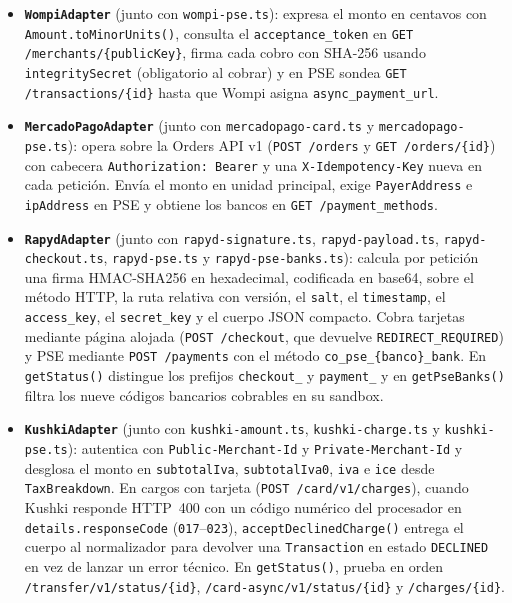 \begin{itemize}
  \item \textbf{\texttt{WompiAdapter}} (junto con \texttt{wompi-pse.ts}): expresa el monto en centavos con \texttt{Amount.toMinorUnits()}, consulta el \texttt{acceptance\_token} en \texttt{GET /merchants/\{publicKey\}}, firma cada cobro con SHA-256 usando \texttt{integritySecret} (obligatorio al cobrar) y en PSE sondea \texttt{GET /transactions/\{id\}} hasta que Wompi asigna \texttt{async\_payment\_url}.
  \item \textbf{\texttt{MercadoPagoAdapter}} (junto con \texttt{mercadopago-card.ts} y \texttt{mercadopago-pse.ts}): opera sobre la Orders API v1 (\texttt{POST /orders} y \texttt{GET /orders/\{id\}}) con cabecera \texttt{Authorization: Bearer} y una \texttt{X-Idempotency-Key} nueva en cada petición. Envía el monto en unidad principal, exige \texttt{PayerAddress} e \texttt{ipAddress} en PSE y obtiene los bancos en \texttt{GET /payment\_methods}.
  \item \textbf{\texttt{RapydAdapter}} (junto con \texttt{rapyd-\allowbreak{}signature.ts}, \texttt{rapyd-\allowbreak{}payload.ts}, \texttt{rapyd-\allowbreak{}checkout.ts}, \texttt{rapyd-\allowbreak{}pse.ts} y \texttt{rapyd-\allowbreak{}pse-\allowbreak{}banks.ts}): calcula por petición una firma HMAC-SHA256 en hexadecimal, codificada en base64, sobre el método HTTP, la ruta relativa con versión, el \texttt{salt}, el \texttt{timestamp}, el \texttt{access\_\allowbreak{}key}, el \texttt{secret\_\allowbreak{}key} y el cuerpo JSON compacto. Cobra tarjetas mediante página alojada (\texttt{POST /\allowbreak{}checkout}, que devuelve \texttt{REDIRECT\_\allowbreak{}REQUIRED}) y PSE mediante \texttt{POST /\allowbreak{}payments} con el método \texttt{co\_\allowbreak{}pse\_\{banco\}\_\allowbreak{}bank}. En \texttt{getStatus()} distingue los prefijos \texttt{checkout\_} y \texttt{payment\_} y en \texttt{getPseBanks()} filtra los nueve códigos bancarios cobrables en su sandbox.
  \item \textbf{\texttt{KushkiAdapter}} (junto con \texttt{kushki-amount.ts}, \texttt{kushki-charge.ts} y \texttt{kushki-pse.ts}): autentica con \texttt{Public-Merchant-Id} y \texttt{Private-Merchant-Id} y desglosa el monto en \texttt{subtotalIva}, \texttt{subtotalIva0}, \texttt{iva} e \texttt{ice} desde \texttt{TaxBreakdown}. En cargos con tarjeta (\texttt{POST /card/v1/charges}), cuando Kushki responde HTTP~400 con un código numérico del procesador en \texttt{details.responseCode} (\texttt{017}--\texttt{023}), \texttt{acceptDeclinedCharge()} entrega el cuerpo al normalizador para devolver una \texttt{Transaction} en estado \texttt{DECLINED} en vez de lanzar un error técnico. En \texttt{getStatus()}, prueba en orden \texttt{/transfer/v1/status/\{id\}}, \texttt{/card-async/v1/status/\{id\}} y \texttt{/charges/\{id\}}.
\end{itemize}

